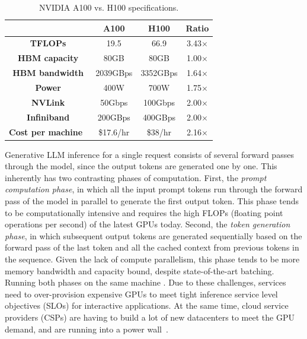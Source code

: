 \begin{table}[]
\centering
\footnotesize
\begin{tabular}{@{}cccc@{}}
\toprule
                       & \textbf{A100} & \textbf{H100}  & \textbf{Ratio}\\ \midrule
\textbf{TFLOPs}        & 19.5              & 66.9     & 3.43$\times$
\\
\textbf{HBM capacity}  & 80GB              & 80GB     & 1.00$\times$ \\
\textbf{HBM bandwidth} & 2039GBps          & 3352GBps & 1.64$\times$ \\
\textbf{Power}         & 400W              & 700W     & 1.75$\times$ \\
\textbf{NVLink}        & 50Gbps            & 100Gbps  & 2.00$\times$ \\
\textbf{Infiniband}    & 200GBps           & 400GBps  & 2.00$\times$ \\
\textbf{Cost per machine~\cite{coreweave}} & \$17.6/hr        & \$38/hr  & 2.16$\times$ \\ 
\bottomrule
\end{tabular}
\caption{NVIDIA A100 vs. H100 specifications.
}
\label{tab:a100_vs_h100_specs}
\vspace{-0.3cm}
\end{table}

Generative LLM inference for a single request consists of several forward passes through the model, since the output tokens are generated one by one.
This inherently has two contrasting phases of computation.
First, the \emph{prompt computation phase}, in which all the input prompt tokens run through the forward pass of the model in parallel to generate the first output token.
This phase tends to be computationally intensive and requires the high FLOPs (floating point operations per second) of the latest GPUs today.
Second, the \emph{token generation phase}, in which subsequent output tokens are generated sequentially based on the forward pass of the last token and all the cached context from previous tokens in the sequence.
Given the lack of compute parallelism, this phase tends to be more memory bandwidth and capacity bound, despite state-of-the-art batching.
Running both phases on the same machine .
Due to these challenges, services need to over-provision expensive GPUs to meet tight inference service level objectives (SLOs) for interactive applications.
At the same time, cloud service providers (CSPs) are having to build a lot of new datacenters to meet the GPU demand, and are running into a power wall~\cite{powerwall}. 

